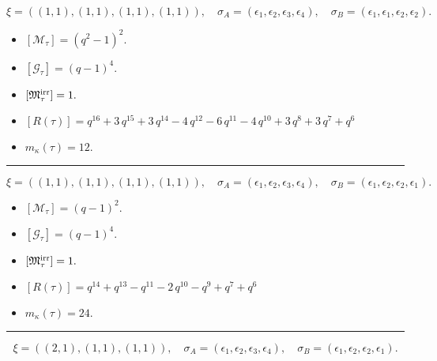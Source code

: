\documentclass[10pt,a4paper]{amsart}
\begin{document}
$$\xi = ({(1, 1), (1, 1)}, {(1, 1), (1, 1)}),\quad \sigma_A = ({{\epsilon_1}, {\epsilon_2}}, {{\epsilon_3}, {\epsilon_4}}),\quad \sigma_B = ({{\epsilon_1}, {\epsilon_1}}, {{\epsilon_2}, {\epsilon_2}}).$$

\begin{itemize}
 \item $[\mathcal{M}_{\tau}] = {\left(q^{2} - 1\right)}^{2} .$

 \item $[\mathcal{G}_{\tau}] = {\left(q - 1\right)}^{4} .$

 \item $[{\frak M}_{\tau}^{\textrm{irr}}] = 1 .$

 \item $[R(\tau)] = q^{16} + 3 \, q^{15} + 3 \, q^{14} - 4 \, q^{12} - 6 \, q^{11} - 4 \, q^{10} + 3 \, q^{8} + 3 \, q^{7} + q^{6} $

 \item $m_{\kappa}(\tau) = 12 .$

 \end{itemize}
\noindent\rule{8cm}{0.4pt}

$$\xi = ({(1, 1), (1, 1)}, {(1, 1), (1, 1)}),\quad \sigma_A = ({{\epsilon_1}, {\epsilon_2}}, {{\epsilon_3}, {\epsilon_4}}),\quad \sigma_B = ({{\epsilon_1}, {\epsilon_2}}, {{\epsilon_2}, {\epsilon_1}}).$$

\begin{itemize}
 \item $[\mathcal{M}_{\tau}] = {\left(q - 1\right)}^{2} .$

 \item $[\mathcal{G}_{\tau}] = {\left(q - 1\right)}^{4} .$

 \item $[{\frak M}_{\tau}^{\textrm{irr}}] = 1 .$

 \item $[R(\tau)] = q^{14} + q^{13} - q^{11} - 2 \, q^{10} - q^{9} + q^{7} + q^{6} $

 \item $m_{\kappa}(\tau) = 24 .$

 \end{itemize}
\noindent\rule{8cm}{0.4pt}

$$\xi = ({(2, 1)}, {(1, 1)}, {(1, 1)}),\quad \sigma_A = ({{\epsilon_1, \epsilon_2}}, {{\epsilon_3}}, {{\epsilon_4}}),\quad \sigma_B = ({{\epsilon_1, \epsilon_2}}, {{\epsilon_2}}, {{\epsilon_1}}).$$
\end{document}
